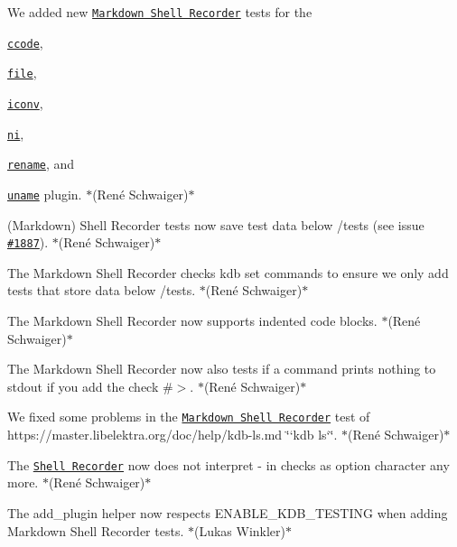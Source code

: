 \begin{DoxyItemize}
\item We added new \href{https://master.libelektra.org/tests/shell/shell_recorder/tutorial_wrapper}{\tt Markdown Shell Recorder} tests for the
\begin{DoxyItemize}
\item \href{https://www.libelektra.org/plugins/ccode}{\tt {\ttfamily ccode}},
\item \href{https://www.libelektra.org/plugins/file}{\tt {\ttfamily file}},
\item \href{https://www.libelektra.org/plugins/iconv}{\tt {\ttfamily iconv}},
\item \href{https://www.libelektra.org/plugins/ni}{\tt {\ttfamily ni}},
\item \href{https://www.libelektra.org/plugins/rename}{\tt {\ttfamily rename}}, and
\item \href{https://www.libelektra.org/plugins/uname}{\tt {\ttfamily uname}} plugin. $\ast$(René Schwaiger)$\ast$
\end{DoxyItemize}
\item (Markdown) Shell Recorder tests now save test data below {\ttfamily /tests} (see issue \href{https://github.com/ElektraInitiative/libelektra/issues/1887}{\tt \#1887}). $\ast$(René Schwaiger)$\ast$
\item The Markdown Shell Recorder checks {\ttfamily kdb set} commands to ensure we only add tests that store data below {\ttfamily /tests}. $\ast$(René Schwaiger)$\ast$
\item The Markdown Shell Recorder now supports indented code blocks. $\ast$(René Schwaiger)$\ast$
\item The Markdown Shell Recorder now also tests if a command prints nothing to {\ttfamily stdout} if you add the check {\ttfamily \#$>$}. $\ast$(René Schwaiger)$\ast$
\item We fixed some problems in the \href{https://master.libelektra.org/tests/shell/shell_recorder/tutorial_wrapper}{\tt Markdown Shell Recorder} test of https\+://master.libelektra.\+org/doc/help/kdb-\/ls.md \char`\"{}`kdb ls`\char`\"{}. $\ast$(René Schwaiger)$\ast$
\item The \href{(https://master.libelektra.org/tests/shell/shell_recorder)}{\tt Shell Recorder} now does not interpret {\ttfamily -\/} in checks as option character any more. $\ast$(René Schwaiger)$\ast$
\item The {\ttfamily add\+\_\+plugin} helper now respects {\ttfamily E\+N\+A\+B\+L\+E\+\_\+\+K\+D\+B\+\_\+\+T\+E\+S\+T\+I\+NG} when adding Markdown Shell Recorder tests. $\ast$(Lukas Winkler)$\ast$

\end{DoxyItemize}

